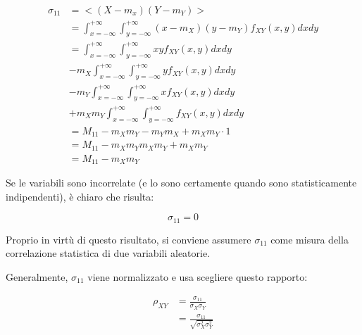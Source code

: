 {
    \Large 
    \begin{equation}
        \begin{split}
            \sigma_{11}
            &= 
            <(X - m_x) (Y - m_Y) >
            \\
            &= 
            \int_{x = -\infty}^{+ \infty}
            \int_{y = -\infty}^{+ \infty}
            (x - m_X)
            (y - m_Y) 
            f_{XY} (x, y) 
            dx dy
            \\  
            &=
            \int_{x = -\infty}^{+ \infty}
            \int_{y = -\infty}^{+ \infty}
            x
            y  
            f_{XY} (x, y) 
            dx dy
            \\
            &-m_X
            \int_{x = -\infty}^{+ \infty}
            \int_{y = -\infty}^{+ \infty}
            y  
            f_{XY} (x, y) 
            dx dy 
            \\
            &-m_Y
            \int_{x = -\infty}^{+ \infty}
            \int_{y = -\infty}^{+ \infty}
            x  
            f_{XY} (x, y) 
            dx dy
            \\
            &+m_Xm_Y
            \int_{x = -\infty}^{+ \infty}
            \int_{y = -\infty}^{+ \infty}
            f_{XY} (x, y) 
            dx dy 
            \\
            &= 
            M_{11} -m_X m_Y -m_Y m_X + m_X m_Y \cdot 1 
            \\
            &= 
            M_{11} -m_X m_Y m_X m_Y + m_X m_Y
            \\ 
            &= 
            M_{11} -m_X m_Y
        \end{split}
    \end{equation}
}

Se le variabili sono incorrelate (e lo sono certamente quando sono statisticamente indipendenti), 
è chiaro che risulta: 

{
    \Large 
    \begin{equation}
        \sigma_{11} = 0
    \end{equation}
}

Proprio in virtù di questo risultato, si conviene assumere $\sigma_{11}$ come misura della correlazione statistica di due variabili aleatorie. \newline 

Generalmente, $\sigma_{11}$ viene normalizzato e usa scegliere questo rapporto: 

{
    \Large 
    \begin{equation}
        \begin{split}
            \rho_{XY}
            &= 
            \frac{\sigma_{11}}{\sigma_X \sigma_Y}
            \\
            &= 
            \frac{\sigma_{11}}{\sqrt{\sigma_X ^{2} \sigma_Y ^{2}}}
        \end{split} 
    \end{equation}
}

